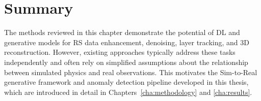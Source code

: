 \section*{Summary}
The methods reviewed in this chapter demonstrate the potential of DL and generative models for RS data enhancement, denoising, layer tracking, and 3D reconstruction.
However, existing approaches typically address these tasks independently and often rely on simplified assumptions about the relationship between simulated physics and real observations.
This motivates the Sim-to-Real generative framework and anomaly detection pipeline developed in this thesis, which are introduced in detail in Chapters~\ref{cha:methodology} and \ref{cha:results}.

